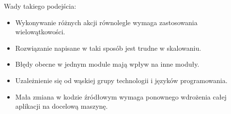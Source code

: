{{{            Wady takiego podejścia:
            \begin{itemize}
                \item Wykonywanie różnych akcji równolegle wymaga zastosowania wielowątkowości.
                \item Rozwiązanie napisane w taki sposób jest trudne w skalowaniu.
                \item Błędy obecne w jednym module mają wpływ na inne moduły.
                \item Uzależnienie się od wąskiej grupy technologii i języków programowania.
                \item Mała zmiana w kodzie źródłowym wymaga ponownego wdrożenia całej aplikacji na docelową maszynę. 
            \end{itemize}
        }
    } 
}